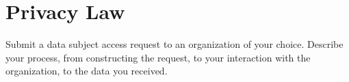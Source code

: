 \pagebreak
\section{Privacy Law}

Submit a data subject access request to an organization of your choice.
Describe your process, from constructing the request, to your interaction with
the organization, to the data you received.
\ansbelow
\eprob
